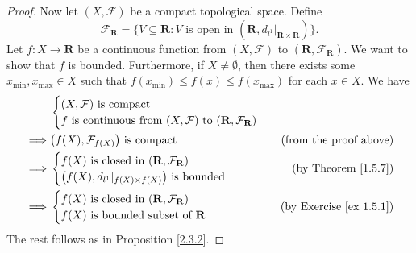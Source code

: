 \begin{proof}
    Now let \((X, \mathcal{F})\) be a compact topological space.
    Define
    \[
        \mathcal{F}_{\mathbf{R}} = \{V \subseteq \mathbf{R} : V \text{ is open in } (\mathbf{R}, d_{l^1}|_{\mathbf{R} \times \mathbf{R}})\}.
    \]
    Let \(f : X \to \mathbf{R}\) be a continuous function from \((X, \mathcal{F})\) to \((\mathbf{R}, \mathcal{F}_{\mathbf{R}})\).
    We want to show that \(f\) is bounded.
    Furthermore, if \(X \neq \emptyset\), then there exists some \(x_{\min}, x_{\max} \in X\) such that \(f(x_{\min}) \leq f(x) \leq f(x_{\max})\) for each \(x \in X\).
    We have
    \begin{align*}
                 & \begin{cases}
                       (X, \mathcal{F}) \text{ is compact} \\
                       f \text{ is continuous from } (X, \mathcal{F}) \text{ to } (\mathbf{R}, \mathcal{F}_{\mathbf{R}})
                   \end{cases}                                  \\
        \implies & \big(f(X), \mathcal{F}_{f(X)}\big) \text{ is compact}                                                                            & \text{(from the proof above)} \\
        \implies & \begin{cases}
                       f(X) \text{ is closed in } (\mathbf{R}, \mathcal{F}_{\mathbf{R}}) \\
                       \big(f(X), d_{l^1}|_{f(X) \times f(X)}\big) \text{ is bounded}
                   \end{cases}                              & \text{(by Theorem \ref{1.5.7})}                                                                 \\
        \implies & \begin{cases}
                       f(X) \text{ is closed in } (\mathbf{R}, \mathcal{F}_{\mathbf{R}}) \\
                       f(X) \text{ is bounded subset of } \mathbf{R}
                   \end{cases}                              & \text{(by Exercise \ref{ex 1.5.1})}
    \end{align*}
    The rest follows as in Proposition \ref{2.3.2}.
\end{proof}